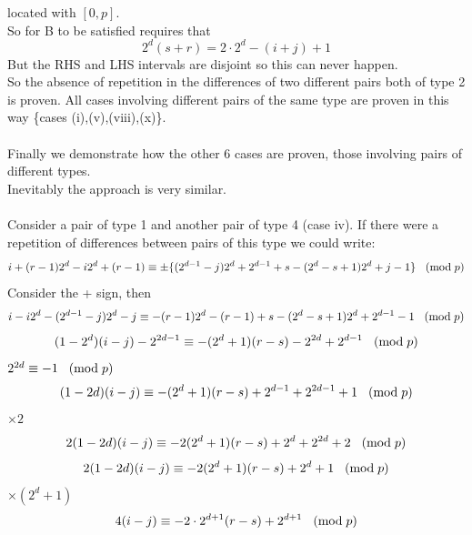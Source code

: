 \documentclass[
  12pt,
  a4paper]{book}
\begin{document}
located with \([0,p]\).\\
So for B to be satisfied requires that \[2^d(s+r)=2 \cdot 2^d-(i+j)+1\]
But the RHS and LHS intervals are disjoint so this can never happen.\\
So the absence of repetition in the differences of two different pairs
both of type 2 is proven. All cases involving different pairs of the
same type are proven in this way \{cases (i),(v),(viii),(x)\}.\\
~\\
Finally we demonstrate how the other 6 cases are proven, those involving
pairs of different types.\\
Inevitably the approach is very similar.\\
~\\
Consider a pair of type 1 and another pair of type 4 (case iv). If there
were a repetition of differences between pairs of this type we could
write:
\[i+(r-1)2^d-i2^d+(r-1) \equiv \pm \{(2^{d-1}-j)2^d+2^{d-1}+s-(2^d-s+1)2^d+j-1\}
\hspace{0.3cm} (\mathrm{mod} \hspace{0.1cm} p)\] Consider the + sign,
then
\[i-i2^d-(2^{d-1}-j)2^d-j \equiv -(r-1)2^d-(r-1)+s-(2^d-s+1)2^d+2^{d-1}-1
\hspace{0.3cm} (\mathrm{mod} \hspace{0.1cm} p)\]
\[(1-2^d)(i-j)-2^{2d-1} \equiv -(2^d+1)(r-s)-2^{2d}+2^{d-1}
\hspace{0.3cm} (\mathrm{mod} \hspace{0.1cm} p)\]
\(2^{2d} \equiv -1\hspace{0.3cm} (\mathrm{mod} \hspace{0.1cm} p)\)\\
\[(1-2d)(i-j) \equiv -(2^d+1)(r-s)+2^{d-1} + 2^{2d-1} + 1
\hspace{0.3cm} (\mathrm{mod} \hspace{0.1cm} p)\] \(\times 2\)\\
\[2(1-2d)(i-j) \equiv -2(2^d+1)(r-s)+2^{d} + 2^{2d} + 2
\hspace{0.3cm} (\mathrm{mod} \hspace{0.1cm} p)\]
\[2(1-2d)(i-j) \equiv -2(2^d+1)(r-s)+2^{d}+1
\hspace{0.3cm} (\mathrm{mod} \hspace{0.1cm} p)\] \(\times(2^d+1)\)\\
\[4(i-j) \equiv -2 \cdot 2^{d+1}(r-s)+2^{d+1}
\hspace{0.3cm} (\mathrm{mod} \hspace{0.1cm} p)\]
\end{document}
